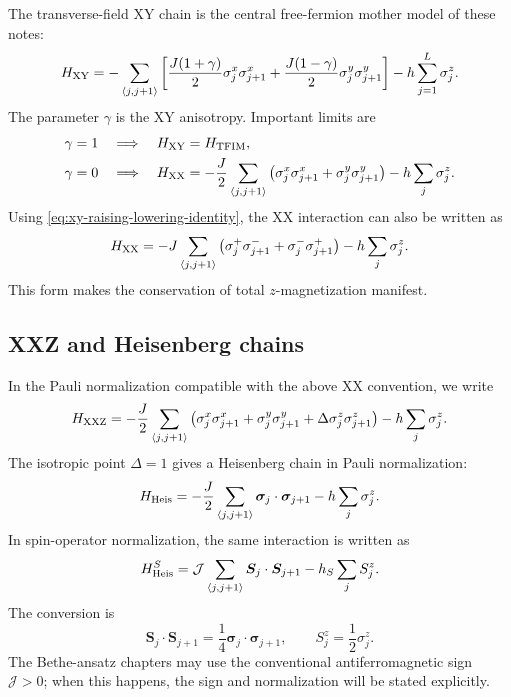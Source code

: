 The transverse-field XY chain is the central free-fermion mother model of these
notes:
\begin{equation}
\label{eq:xy-convention-chapter}
    H_{\rm XY}
    =
    -\sum_{\langle j,j+1\rangle}
    \left[
        \frac{J(1+\gamma)}{2}\sigma_j^x\sigma_{j+1}^x
        +
        \frac{J(1-\gamma)}{2}\sigma_j^y\sigma_{j+1}^y
    \right]
    -
    h\sum_{j=1}^{L}\sigma_j^z .
\end{equation}
The parameter $\gamma$ is the XY anisotropy. Important limits are
\begin{align}
    \gamma=1
    &\quad\Longrightarrow\quad
    H_{\rm XY}=H_{\rm TFIM},
    \\
    \gamma=0
    &\quad\Longrightarrow\quad
    H_{\rm XX}
    =
    -\frac{J}{2}
    \sum_{\langle j,j+1\rangle}
    \left(
        \sigma_j^x\sigma_{j+1}^x
        +
        \sigma_j^y\sigma_{j+1}^y
    \right)
    -h\sum_j\sigma_j^z .
\end{align}
Using \cref{eq:xy-raising-lowering-identity}, the XX interaction can also be
written as
\begin{equation}
    H_{\rm XX}
    =
    -J\sum_{\langle j,j+1\rangle}
    \left(
        \sigma_j^+\sigma_{j+1}^-
        +
        \sigma_j^-\sigma_{j+1}^+
    \right)
    -h\sum_j\sigma_j^z .
\end{equation}
This form makes the conservation of total $z$-magnetization manifest.

\subsection{XXZ and Heisenberg chains}

In the Pauli normalization compatible with the above XX convention, we write
\begin{equation}
\label{eq:xxz-pauli-convention}
    H_{\rm XXZ}
    =
    -\frac{J}{2}
    \sum_{\langle j,j+1\rangle}
    \left(
        \sigma_j^x\sigma_{j+1}^x
        +
        \sigma_j^y\sigma_{j+1}^y
        +
        \Delta\sigma_j^z\sigma_{j+1}^z
    \right)
    -h\sum_j\sigma_j^z .
\end{equation}
The isotropic point $\Delta=1$ gives a Heisenberg chain in Pauli normalization:
\begin{equation}
    H_{\rm Heis}
    =
    -\frac{J}{2}
    \sum_{\langle j,j+1\rangle}
    \bm{\sigma}_j\cdot\bm{\sigma}_{j+1}
    -h\sum_j\sigma_j^z .
\end{equation}
In spin-operator normalization, the same interaction is written as
\begin{equation}
    H_{\rm Heis}^{S}
    =
    \mathcal{J}\sum_{\langle j,j+1\rangle}
    \bm{S}_j\cdot\bm{S}_{j+1}
    -h_S\sum_j S_j^z.
\end{equation}
The conversion is
\begin{equation}
    \bm{S}_j\cdot\bm{S}_{j+1}
    =
    \frac14\bm{\sigma}_j\cdot\bm{\sigma}_{j+1},
    \qquad
    S_j^z=\frac12\sigma_j^z.
\end{equation}
The Bethe-ansatz chapters may use the conventional antiferromagnetic sign
$\mathcal{J}>0$; when this happens, the sign and normalization will be stated
explicitly.

